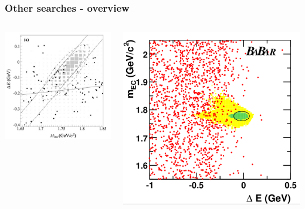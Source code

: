 \documentclass[xcolor=table]{beamer}
\begin{document}
\begin{frame}
\frametitle{Other searches - overview}

\begin{columns}
\begin{column}{0.5\textwidth}
\begin{center}
\includegraphics[width=\textwidth]{images/belle-mu-GSR.png}
\end{center}
\end{column}

\begin{column}{0.5\textwidth}
\begin{center}
\includegraphics[width=\textwidth]{images/babar-mu-GSR.png}
\end{center}
\end{column}


\end{columns}
\end{frame}
\end{document}
